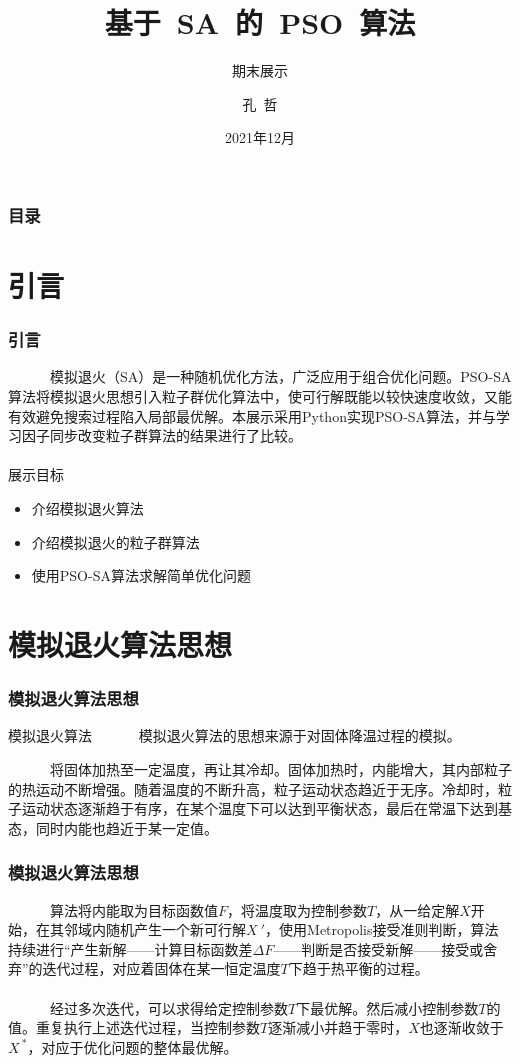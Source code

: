 \documentclass{beamer}
\title[PSO-SA] %
{基于~SA~的~PSO~算法}
\subtitle{期末展示}
\author[Zhe Kong] %
{孔~哲\inst{1}}
\institute[IMUT] %
{
	\inst{1}%
	内蒙古工业大学~电力学院
}
\date[Dec. 2020] %
{2021年12月}
\begin{document}
	
	\begin{frame}
		\titlepage %
	\end{frame}

	\begin{frame}
		\frametitle{目录}
		\tableofcontents
	\end{frame}

	\section{引言}
	
	\begin{frame}
		\frametitle{引言}
		~~~~~~模拟退火（SA）是一种随机优化方法，广泛应用于组合优化问题。PSO-SA算法将模拟退火思想引入粒子群优化算法中，使可行解既能以较快速度收敛，又能有效避免搜索过程陷入局部最优解。\cite{b1}本展示采用Python实现PSO-SA算法，并与学习因子同步改变粒子群算法的结果进行了比较。\\~\\
		展示目标
		\begin{itemize}
			\item 介绍模拟退火算法
			\item 介绍模拟退火的粒子群算法
			\item 使用PSO-SA算法求解简单优化问题
		\end{itemize}
	\end{frame}

	\section{模拟退火算法思想}
	
	\begin{frame}
		\frametitle{模拟退火算法思想}
		\begin{block}{模拟退火算法}
			~~~~~~模拟退火算法的思想来源于对固体降温过程的模拟。\cite{b2}
		\end{block}
		~~~~~~将固体加热至一定温度，再让其冷却。固体加热时，内能增大，其内部粒子的热运动不断增强。随着温度的不断升高，粒子运动状态趋近于无序。冷却时，粒子运动状态逐渐趋于有序，在某个温度下可以达到平衡状态，最后在常温下达到基态，同时内能也趋近于某一定值。\cite{b1,b2}
	\end{frame}

	\begin{frame}
		\frametitle{模拟退火算法思想}
		~~~~~~算法将内能取为目标函数值$F$，将温度取为控制参数$T$，从一给定解$X$开始，在其邻域内随机产生一个新可行解$X~'$，使用Metropolis接受准则判断，算法持续进行“产生新解——计算目标函数差$\Delta F$——判断是否接受新解——接受或舍弃”的迭代过程，对应着固体在某一恒定温度$T$下趋于热平衡的过程。\\~\\
		~~~~~~经过多次迭代，可以求得给定控制参数$T$下最优解。然后减小控制参数$T$的值。重复执行上述迭代过程，当控制参数$T$逐渐减小并趋于零时，$X$也逐渐收敛于$X^{~*}$，对应于优化问题的整体最优解。
	\end{frame}
\end{document}
